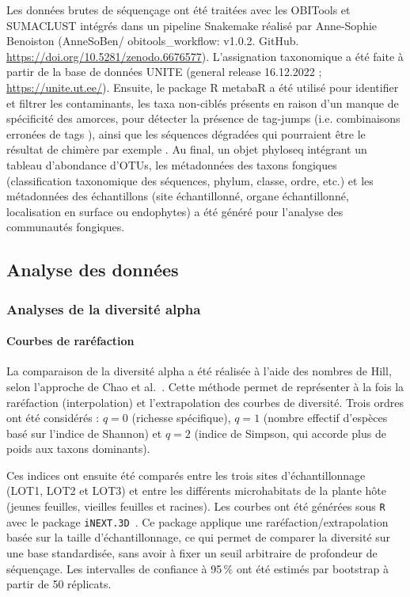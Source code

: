 \documentclass[a4paper,12pt]{article}
\begin{document}
Les données brutes de séquençage ont été traitées avec les OBITools \citep{boyer2016obitools} et SUMACLUST \citep{mercier2013sumatra} intégrés dans un pipeline Snakemake \citep{molder2025sustainable} réalisé par Anne-Sophie Benoiston (AnneSoBen/ obitools\_workflow: v1.0.2. GitHub. \url{https://doi.org/10.5281/zenodo.6676577}). L’assignation taxonomique a été faite à partir de la base de données UNITE (general release 16.12.2022 ; \url{https://unite.ut.ee/}). Ensuite, le package R metabaR \citep{zinger2021metabar} a été utilisé pour identifier et filtrer les contaminants, les taxa non-ciblés présents en raison d’un manque de spécificité des amorces, pour détecter la présence de tag-jumps (i.e. combinaisons erronées de tags \citep{schnell2015tag}), ainsi que les séquences dégradées qui pourraient être le résultat de chimère par exemple \citep{zinger2021metabar}. Au final, un objet phyloseq intégrant un tableau d’abondance d’OTUs, les métadonnées des taxons fongiques (classification taxonomique des séquences, phylum, classe, ordre, etc.)  et les métadonnées des échantillons (site échantillonné, organe échantillonné, localisation en surface ou endophytes) a été généré pour l’analyse des communautés fongiques.



\subsection{Analyse des données}

\subsubsection{Analyses de la diversité alpha}

\paragraph{Courbes de raréfaction}

La comparaison de la diversité alpha a été réalisée à l’aide des nombres de Hill, selon l’approche de Chao et al.~\citep{chao2014rarefaction}. Cette méthode permet de représenter à la fois la raréfaction (interpolation) et l’extrapolation des courbes de diversité. Trois ordres ont été considérés : \(q=0\) (richesse spécifique), \(q=1\) (nombre effectif d’espèces basé sur l’indice de Shannon) et \(q=2\) (indice de Simpson, qui accorde plus de poids aux taxons dominants). 

Ces indices ont ensuite été comparés entre les trois sites d’échantillonnage (LOT1, LOT2 et LOT3) et entre les différents microhabitats de la plante hôte (jeunes feuilles, vieilles feuilles et racines). Les courbes ont été générées sous \texttt{R} avec le package \texttt{iNEXT.3D}~\citep{chao2021measuring}. Ce package applique une raréfaction/extrapolation basée sur la taille d’échantillonnage, ce qui permet de comparer la diversité sur une base standardisée, sans avoir à fixer un seuil arbitraire de profondeur de séquençage. Les intervalles de confiance à 95\,\% ont été estimés par bootstrap à partir de 50 réplicats. 
\end{document}
